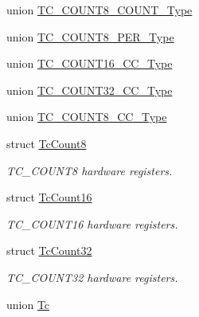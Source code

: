 \begin{DoxyCompactItemize}
union \mbox{\hyperlink{union_t_c___c_o_u_n_t8___c_o_u_n_t___type}{T\+C\+\_\+\+C\+O\+U\+N\+T8\+\_\+\+C\+O\+U\+N\+T\+\_\+\+Type}}
\item 
union \mbox{\hyperlink{union_t_c___c_o_u_n_t8___p_e_r___type}{T\+C\+\_\+\+C\+O\+U\+N\+T8\+\_\+\+P\+E\+R\+\_\+\+Type}}
\item 
union \mbox{\hyperlink{union_t_c___c_o_u_n_t16___c_c___type}{T\+C\+\_\+\+C\+O\+U\+N\+T16\+\_\+\+C\+C\+\_\+\+Type}}
\item 
union \mbox{\hyperlink{union_t_c___c_o_u_n_t32___c_c___type}{T\+C\+\_\+\+C\+O\+U\+N\+T32\+\_\+\+C\+C\+\_\+\+Type}}
\item 
union \mbox{\hyperlink{union_t_c___c_o_u_n_t8___c_c___type}{T\+C\+\_\+\+C\+O\+U\+N\+T8\+\_\+\+C\+C\+\_\+\+Type}}
\item 
struct \mbox{\hyperlink{struct_tc_count8}{Tc\+Count8}}
\begin{DoxyCompactList}\small\item\em T\+C\+\_\+\+C\+O\+U\+N\+T8 hardware registers. \end{DoxyCompactList}\item 
struct \mbox{\hyperlink{struct_tc_count16}{Tc\+Count16}}
\begin{DoxyCompactList}\small\item\em T\+C\+\_\+\+C\+O\+U\+N\+T16 hardware registers. \end{DoxyCompactList}\item 
struct \mbox{\hyperlink{struct_tc_count32}{Tc\+Count32}}
\begin{DoxyCompactList}\small\item\em T\+C\+\_\+\+C\+O\+U\+N\+T32 hardware registers. \end{DoxyCompactList}\item 
union \mbox{\hyperlink{union_tc}{Tc}}
\end{DoxyCompactItemize}
